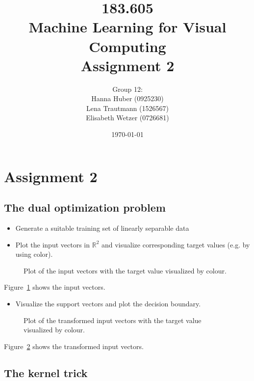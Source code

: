 \documentclass[a4]{article}
\title{\bf 183.605 \\ Machine Learning for Visual Computing \\ Assignment 2}
\author{Group 12: \\
	Hanna Huber (0925230) \\ Lena Trautmann (1526567) \\ Elisabeth Wetzer (0726681)}
\date{\today}
\begin{document}
\maketitle
\noindent

\section{Assignment 2}
\subsection{The dual optimization problem}

\begin{itemize}
\item Generate a suitable training set of linearly separable data
\end{itemize}

\begin{itemize}
\item Plot the input vectors in $\mathbb{R}^2$ and visualize corresponding target values (e.g. by using color). 
\end{itemize}
\begin{figure}[!h]
	\begin{center}
		\centering
	\end{center}	
	\caption{Plot of the input vectors with the target value visualized by colour.}
	\label{fig:inputVectors}
\end{figure}
Figure~\ref{fig:inputVectors} shows the input vectors.

\begin{itemize}
\item Visualize the support vectors and plot the decision boundary.
\end{itemize}
\begin{figure}[!h]
	\begin{center}
		\centering
	\end{center}
	\caption{Plot of the transformed input vectors with the target value visualized by colour.}
	\label{fig:transformedInputVectors}
\end{figure}
Figure~\ref{fig:transformedInputVectors} shows the transformed input vectors.

\subsection{The kernel trick}
\end{document}

